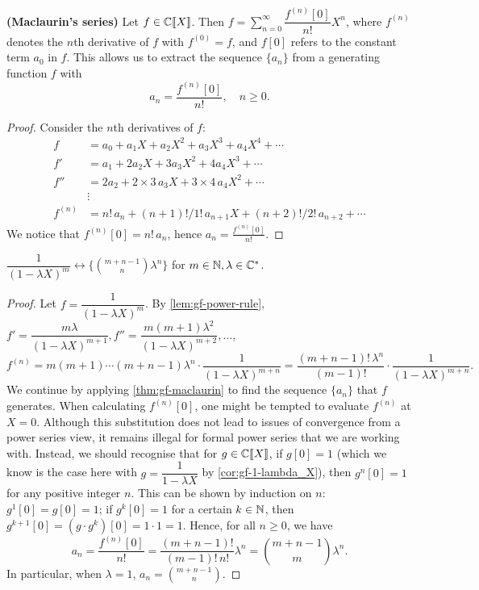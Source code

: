 \documentclass[a4paper, 12pt]{report}
\begin{document}
\begin{thm}\label{thm:gf-maclaurin}
\textbf{(Maclaurin's series)} Let $f \in \mathbb{C}\llbracket X \rrbracket$. Then $f = \sum_{n = 0}^\infty \dfrac{f^{(n)}[0]}{n!} X^n$, where $f^{(n)}$ denotes the $n$th derivative of $f$ with $f^{(0)} = f$, and $f[0]$ refers to the constant term $a_0$ in $f$. This allows us to extract the sequence $\{a_n\}$ from a generating function $f$ with \[a_n = \frac{f^{(n)}[0]}{n!}, \quad n \geq 0.\]
\end{thm}
\begin{proof}
Consider the $n$th derivatives of $f$:
\begin{align*}
f   &= a_0 + a_1 X + a_2 X^2 + a_3 X^3 + a_4 X^4 + \cdots\\
f'  &= a_1 + 2 a_2 X + 3 a_3 X^2 + 4 a_4 X^3 + \cdots\\
f'' &= 2 a_2 + 2 \times 3\,a_3 X + 3 \times 4\,a_4 X^2 + \cdots\\
&\vdots\\
f^{(n)} &= n!\,a_n + (n + 1)! / 1!\,a_{n + 1} X + (n + 2)! / 2!\,a_{n + 2} + \cdots
\end{align*}
We notice that $f^{(n)}[0] = n!\,a_n$, hence $a_n = \frac{f^{(n)}[0]}{n!}$.
\end{proof}

\begin{cor}\label{cor:gf-1-lambdaX-raised-to-m}
$\dfrac{1}{(1 - \lambda X)^m} \longleftrightarrow \{\binom{m + n - 1}{n} \lambda^n\}$ for $m \in \mathbb{N}, \lambda \in \mathbb{C}^*$.
\end{cor}
\begin{proof}
Let $f = \dfrac{1}{(1 - \lambda X)^m}$. By \cref{lem:gf-power-rule}, $f' = \dfrac{m \lambda}{(1 - \lambda X)^{m + 1}}, f'' = \dfrac{m(m + 1) \lambda^2}{(1 - \lambda X)^{m + 2}}, \dots$, 
\[
f^{(n)} 
= m (m + 1) \cdots (m + n - 1) \lambda^n \cdot \dfrac{1}{(1 - \lambda X)^{m + n}}
= \dfrac{(m + n - 1)!\,\lambda^n}{(m - 1)!} \cdot \dfrac{1}{(1 - \lambda X)^{m + n}}
.
\]
We continue by applying \cref{thm:gf-maclaurin} to find the sequence $\{a_n\}$ that $f$ generates. When calculating $f^{(n)}[0]$, one might be tempted to evaluate $f^{(n)}$ at $X = 0$. Although this substitution does not lead to issues of convergence from a power series view, it remains illegal for formal power series that we are working with. Instead, we should recognise that for $g \in \mathbb{C}\llbracket X \rrbracket$, if $g[0] = 1$ (which we know is the case here with $g = \dfrac{1}{1 - \lambda X}$ by \cref{cor:gf-1-lambda_X}), then $g^n[0] = 1$ for any positive integer $n$. This can be shown by induction on $n$: $g^1[0] = g[0] = 1$; if $g^k[0] = 1$ for a certain $k \in \mathbb{N}$, then $g^{k + 1}[0] = (g \cdot g^k)[0] = 1 \cdot 1 = 1$. Hence, for all $n \geq 0$, we have 
\[a_n = \frac{f^{(n)}[0]}{n!} = \dfrac{(m + n - 1)!}{(m - 1)!\,n!} \lambda^n = \binom{m + n - 1}{m} \lambda^n.\]
In particular, when $\lambda = 1$, $a_n = \binom{m + n - 1}{n}$.
\end{proof}
\end{document}
